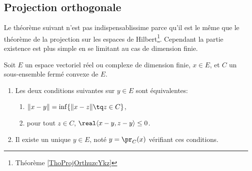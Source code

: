 \subsection{Projection orthogonale}

Le théorème suivant n'est pas indispensablissime parce qu'il est le même que le théorème de la projection sur les espaces de Hilbert\footnote{Théorème \ref{ThoProjOrthuzcYkz}}. Cependant la partie existence est plus simple en se limitant au cas de dimension finie.
\begin{theorem}  \label{ThoWKwosrH}
    Soit \( E\) un espace vectoriel réel ou complexe de dimension finie, \( x\in E\), et \( C\) un sous-ensemble fermé convexe de \(E\).
    \begin{enumerate}
        \item
            Les deux conditions suivantes sur \( y\in E\) sont équivalentes:
    \begin{enumerate}
        \item   \label{zzETsfYCSItemi}
            \( \| x-y \|=\inf\{ \| x-z \|\tq z\in C \}\),
        \item\label{zzETsfYCSItemii}
            pour tout \( z\in C\), \( \real\langle x-y, z-y\rangle \leq 0\).
    \end{enumerate}
\item
    Il existe un unique \( y\in E\), noté \( y=\pr_C(x)\) vérifiant ces conditions.
    \end{enumerate}
\end{theorem}

